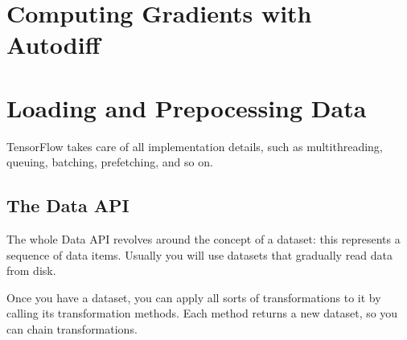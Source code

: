 \documentclass[french]{article}
\begin{document}
\section{Computing Gradients with Autodiff}

\section{Loading and Prepocessing Data}

TensorFlow takes care of all implementation details, such as multithreading, queuing, batching, prefetching, and so on.

\subsection{The Data API}

The whole Data API revolves around the concept of a dataset: this represents a sequence of data items. Usually you will use datasets that gradually read data from disk.

Once you have a dataset, you can apply all sorts of transformations to it by calling its transformation methods. Each method returns a new dataset, so you can chain transformations.
\end{document}

